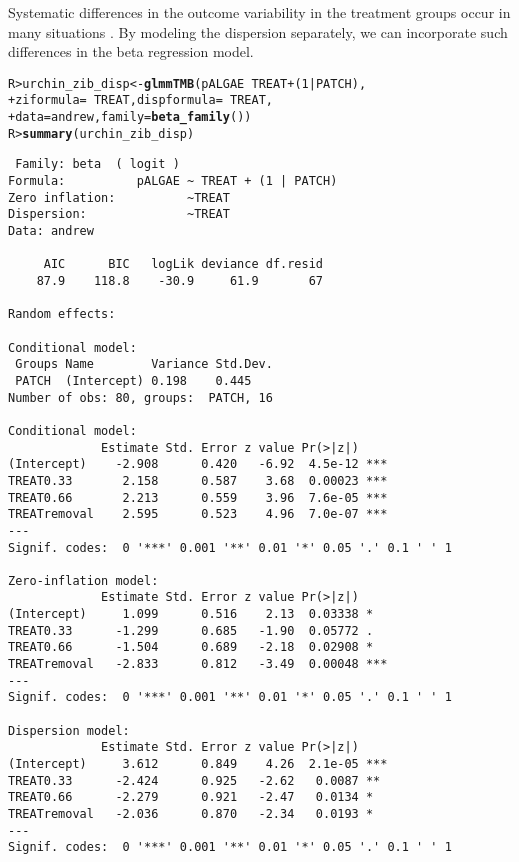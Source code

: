\documentclass[11pt]{article}\usepackage[]{graphicx}\usepackage{xcolor}
\makeatletter
\newcommand{\hlnum}[1]{\textcolor[rgb]{0.686,0.059,0.569}{#1}}%
\newcommand{\hlopt}[1]{\textcolor[rgb]{0,0,0}{#1}}%
\newcommand{\hlstd}[1]{\textcolor[rgb]{0.345,0.345,0.345}{#1}}%
\newcommand{\hlkwb}[1]{\textcolor[rgb]{0.69,0.353,0.396}{#1}}%
\newcommand{\hlkwc}[1]{\textcolor[rgb]{0.333,0.667,0.333}{#1}}%
\newcommand{\hlkwd}[1]{\textcolor[rgb]{0.737,0.353,0.396}{\textbf{#1}}}%
\newenvironment{kframe}{%
 \def\at@end@of@kframe{}%
 \ifinner\ifhmode%
  \def\at@end@of@kframe{\end{minipage}}%
  \begin{minipage}{\columnwidth}%
 \fi\fi%
 \def\FrameCommand##1{\hskip\@totalleftmargin \hskip-\fboxsep
 \colorbox{shadecolor}{##1}\hskip-\fboxsep
     \hskip-\linewidth \hskip-\@totalleftmargin \hskip\columnwidth}%
 \MakeFramed {\advance\hsize-\width
   \@totalleftmargin\z@ \linewidth\hsize
   \@setminipage}}%
 {\par\unskip\endMakeFramed%
 \at@end@of@kframe}
\newenvironment{knitrout}{}{} %
\newcommand{\0}{{\mathbf{0}}}
\makeatother
\begin{document}
Systematic differences in the outcome variability
in the treatment groups occur in many situations \citep{Douma_2019}.
By modeling the dispersion separately, we can incorporate such differences
in the beta regression model.
%
\begin{knitrout}\small
{}\color{fgcolor}\begin{kframe}
\begin{alltt}
\hlstd{R> }\hlstd{urchin_zib_disp} \hlkwb{<-} \hlkwd{glmmTMB}\hlstd{(pALGAE} \hlopt{~} \hlstd{TREAT} \hlopt{+} \hlstd{(}\hlnum{1} \hlopt{|} \hlstd{PATCH),}
\hlstd{+  }                           \hlkwc{ziformula} \hlstd{=} \hlopt{~} \hlstd{TREAT,} \hlkwc{dispformula} \hlstd{=} \hlopt{~} \hlstd{TREAT,}
\hlstd{+  }                           \hlkwc{data} \hlstd{= andrew,} \hlkwc{family} \hlstd{=} \hlkwd{beta_family}\hlstd{())}
\hlstd{R> }\hlkwd{summary}\hlstd{(urchin_zib_disp)}
\end{alltt}
\begin{verbatim}
 Family: beta  ( logit )
Formula:          pALGAE ~ TREAT + (1 | PATCH)
Zero inflation:          ~TREAT
Dispersion:              ~TREAT
Data: andrew

     AIC      BIC   logLik deviance df.resid 
    87.9    118.8    -30.9     61.9       67 

Random effects:

Conditional model:
 Groups Name        Variance Std.Dev.
 PATCH  (Intercept) 0.198    0.445   
Number of obs: 80, groups:  PATCH, 16

Conditional model:
             Estimate Std. Error z value Pr(>|z|)    
(Intercept)    -2.908      0.420   -6.92  4.5e-12 ***
TREAT0.33       2.158      0.587    3.68  0.00023 ***
TREAT0.66       2.213      0.559    3.96  7.6e-05 ***
TREATremoval    2.595      0.523    4.96  7.0e-07 ***
---
Signif. codes:  0 '***' 0.001 '**' 0.01 '*' 0.05 '.' 0.1 ' ' 1

Zero-inflation model:
             Estimate Std. Error z value Pr(>|z|)    
(Intercept)     1.099      0.516    2.13  0.03338 *  
TREAT0.33      -1.299      0.685   -1.90  0.05772 .  
TREAT0.66      -1.504      0.689   -2.18  0.02908 *  
TREATremoval   -2.833      0.812   -3.49  0.00048 ***
---
Signif. codes:  0 '***' 0.001 '**' 0.01 '*' 0.05 '.' 0.1 ' ' 1

Dispersion model:
             Estimate Std. Error z value Pr(>|z|)    
(Intercept)     3.612      0.849    4.26  2.1e-05 ***
TREAT0.33      -2.424      0.925   -2.62   0.0087 ** 
TREAT0.66      -2.279      0.921   -2.47   0.0134 *  
TREATremoval   -2.036      0.870   -2.34   0.0193 *  
---
Signif. codes:  0 '***' 0.001 '**' 0.01 '*' 0.05 '.' 0.1 ' ' 1
\end{verbatim}
\end{kframe}
\end{knitrout}
\end{document}
